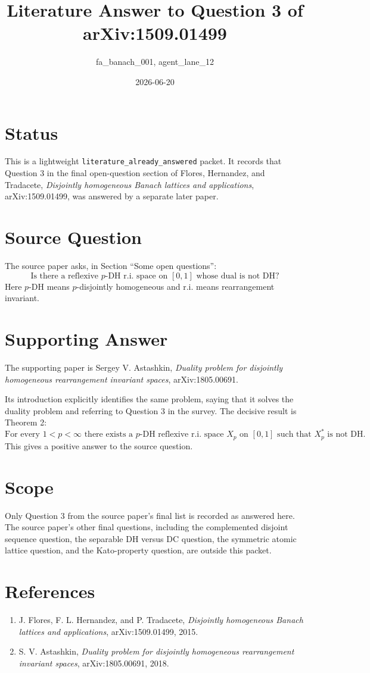 \documentclass[11pt]{article}
\title{Literature Answer to Question 3 of arXiv:1509.01499}
\author{fa\_banach\_001, agent\_lane\_12}
\date{2026-06-20}
\begin{document}
\maketitle

\section*{Status}

This is a lightweight \texttt{literature\_already\_answered} packet. It records
that Question 3 in the final open-question section of Flores, Hernandez, and
Tradacete, \emph{Disjointly homogeneous Banach lattices and applications},
arXiv:1509.01499, was answered by a separate later paper.

\section*{Source Question}

The source paper asks, in Section ``Some open questions'':
\[
\text{Is there a reflexive }p\text{-DH r.i. space on }[0,1]\text{ whose dual is not DH?}
\]
Here \(p\)-DH means \(p\)-disjointly homogeneous and r.i. means
rearrangement invariant.

\section*{Supporting Answer}

The supporting paper is Sergey V. Astashkin,
\emph{Duality problem for disjointly homogeneous rearrangement invariant
spaces}, arXiv:1805.00691.

Its introduction explicitly identifies the same problem, saying that it solves
the duality problem and referring to Question 3 in the survey. The decisive
result is Theorem 2:
\[
\text{For every }1<p<\infty\text{ there exists a }p\text{-DH reflexive r.i.
space }X_p\text{ on }[0,1]\text{ such that }X_p^*\text{ is not DH.}
\]
This gives a positive answer to the source question.

\section*{Scope}

Only Question 3 from the source paper's final list is recorded as answered
here. The source paper's other final questions, including the complemented
disjoint sequence question, the separable DH versus DC question, the symmetric
atomic lattice question, and the Kato-property question, are outside this
packet.

\section*{References}

\begin{enumerate}
\item J. Flores, F. L. Hernandez, and P. Tradacete,
\emph{Disjointly homogeneous Banach lattices and applications},
arXiv:1509.01499, 2015.
\item S. V. Astashkin,
\emph{Duality problem for disjointly homogeneous rearrangement invariant
spaces}, arXiv:1805.00691, 2018.
\end{enumerate}
\end{document}
